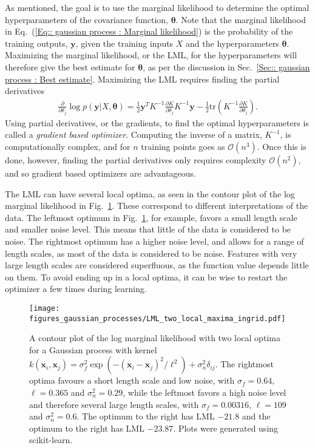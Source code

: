\documentclass[twoside,english]{uiofysmaster}
\begin{document}
As mentioned, the goal is to use the marginal likelihood to determine the optimal hyperparameters of the covariance function, $\boldsymbol{\theta}$. Note that the marginal likelihood in Eq.~(\ref{Eq:: gaussian process : Marginal likelihood}) is the probability of the training outputs, $\textbf{y}$, given the training inputs $X$ and the hyperparameters $\boldsymbol{\theta}$. Maximizing the marginal likelihood, or the LML, for the hyperparameters will therefore give the best estimate for $\boldsymbol{\theta}$, as per the discussion in Sec.~\ref{Sec:: gaussian process : Best estimate}. Maximizing the LML requires finding the partial derivatives 
\begin{align}
\frac{\partial}{\partial \theta_j}
 \log p(\textbf{y}|X, \boldsymbol{\theta}) = \frac{1}{2} \textbf{y}^T K^{-1} \frac{\partial K}{\partial \theta_j} K^{-1} \textbf{y} - \frac{1}{2} \text{tr} (K^{-1} \frac{\partial K}{\partial \theta_j}).
\end{align}
Using partial derivatives, or the gradients, to find the optimal hyperparameters is called a \textit{gradient based optimizer}. Computing the inverse of a matrix, $K^{-1}$, is computationally complex, and for $n$ training points goes as $\mathcal{O}(n^3)$. Once this is done, however, finding the partial derivatives only requires complexity $\mathcal{O}(n^2)$, and so gradient based optimizers are advantageous.

The LML can have several local optima, as seen in the contour plot of the log marginal likelihood in Fig.~\ref{Fig:: gaussian process : LML several local optima}. These correspond to different interpretations of the data. The leftmost optimum in Fig.~\ref{Fig:: gaussian process : LML several local optima}, for example, favors a small length scale and smaller noise level. This means that little of the data is considered to be noise. The rightmost optimum has a higher noise level, and allows for a range of length scales, as most of the data is considered to be noise. Features with very large length scales are considered superfluous, as the function value depends little on them. To avoid ending up in a local optima, it can be wise to restart the optimizer a few times during learning.

\begin{figure}
\centering
\texttt{[image: figures\_gaussian\_processes/LML\_two\_local\_maxima\_ingrid.pdf]}
\caption{A contour plot of the log marginal likelihood with two local optima for a Gaussian process with kernel $k(\textbf{x}_i, \textbf{x}_j) = \sigma_f^2 \exp(- (\textbf{x}_i - \textbf{x}_j)^2 / \ell^2) + \sigma_n^2 \delta_{ij}$. The rightmost optima favours a short length scale and low noise, with $\sigma_f = 0.64$, $\ell = 0.365$ and $\sigma^2_n = 0.29$, while the leftmost favors a high noise level and therefore several large length scales, with $\sigma_f = 0.00316$, $\ell = 109$ and $\sigma^2_n = 0.6$. The optimum to the right has LML $-21.8$ and the optimum to the right has LML $-23.87$. Plots were generated using scikit-learn.}
\label{Fig:: gaussian process : LML several local optima}
\end{figure}
\end{document}
